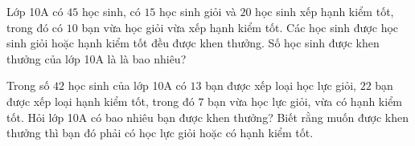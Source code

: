 \begin{bt}%
	Lớp 10A có $45$ học sinh, có $15$ học sinh giỏi và $20$ học sinh xếp hạnh kiểm tốt, trong đó có $10$ bạn vừa học giỏi vừa xếp hạnh kiểm tốt. Các học sinh được học sinh giỏi hoặc hạnh kiểm tốt đều được khen thưởng. Số học sinh được khen thưởng của lớp 10A là là bao nhiêu?
\end{bt}
\begin{bt}%
	Trong số $42$ học sinh của lớp 10A có $13$ bạn được xếp loại học lực giỏi, $22$ bạn được xếp loại hạnh kiểm tốt, trong đó $7$ bạn vừa học lực giỏi, vừa có hạnh kiểm tốt. Hỏi lớp 10A có bao nhiêu bạn được khen thưởng? Biết rằng muốn được khen thưởng thì bạn đó phải có học lực giỏi hoặc có hạnh kiểm tốt.
\end{bt}

